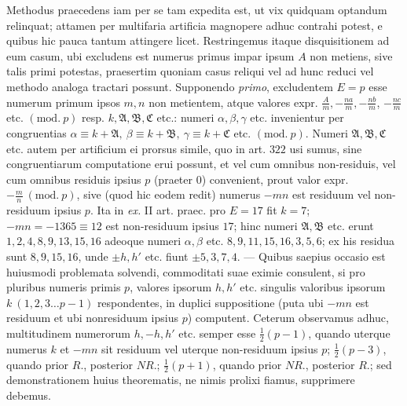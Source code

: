 Methodus praecedens iam per se tam expedita est, ut vix quidquam optandum relinquat; attamen per multifaria artificia magnopere adhuc contrahi potest, e quibus hic pauca tantum attingere licet. Restringemus itaque disquisitionem ad eum casum, ubi excludens est numerus primus impar ipsum \(A\) non metiens, sive talis primi potestas, praesertim quoniam casus reliqui vel ad hunc reduci vel methodo analoga tractari possunt. Supponendo \textit{primo}, excludentem \(E=p\) esse numerum primum ipsos \(m,\allowbreak n\) non metientem, atque valores expr. \(\frac Am,\allowbreak -\frac{na}m,\allowbreak -\frac{nb}m\), \(-\frac{nc}m\) etc. \((\mathrm{mod.}\ p)\) resp. \(k,\allowbreak \mathfrak A,\allowbreak \mathfrak B,\allowbreak \mathfrak C\) etc.: numeri \(\alpha,\allowbreak \beta,\allowbreak \gamma\) etc. invenientur per congruentias \(\alpha\equiv k+\mathfrak A,\allowbreak \ \beta\equiv k+\mathfrak B,\allowbreak \ \gamma\equiv k+\mathfrak C\) etc. \((\mathrm{mod.}\ p)\). Numeri \(\mathfrak A,\allowbreak \mathfrak B,\allowbreak \mathfrak C\) etc. autem per artificium ei prorsus simile, quo in art. \(322\) usi sumus, sine congruentiarum computatione erui possunt, et vel cum omnibus non-residuis, vel cum omnibus residuis ipsius \(p\) (praeter \(0\)) convenient, prout valor expr. \(-\frac mn\ (\mathrm{mod.}\ p)\), sive (quod hic eodem redit) numerus \(-mn\) est residuum vel non-residuum ipsius \(p\). Ita in \textit{ex.} II art. praec. pro \(E=17\) fit \(k=7\); \(-mn=-1365\equiv12\) est non-residuum ipsius \(17\); hinc numeri \(\mathfrak A,\allowbreak \mathfrak B\) etc. erunt \(1,\allowbreak 2,\allowbreak 4,\allowbreak 8,\allowbreak 9,\allowbreak 13,\allowbreak 15,\allowbreak 16\) adeoque numeri \(\alpha,\allowbreak \beta\) etc. \(8,\allowbreak 9,\allowbreak 11,\allowbreak 15,\allowbreak 16,\allowbreak 3,\allowbreak 5,\allowbreak 6\); ex his residua sunt \(8,\allowbreak 9,\allowbreak 15,\allowbreak 16\), unde \(\pm h,\allowbreak h'\) etc. fiunt \(\pm5,\allowbreak 3,\allowbreak 7,\allowbreak 4\). — Quibus saepius occasio est huiusmodi problemata solvendi, commoditati suae eximie consulent, si pro pluribus numeris primis \(p\), valores ipsorum \(h,\allowbreak h'\) etc. singulis valoribus ipsorum \(k\ (1,\allowbreak 2,\allowbreak 3\ldots p-1)\) respondentes, in duplici suppositione (puta ubi \(-mn\) est residuum et ubi nonresiduum ipsius \(p\)) computent. Ceterum observamus adhuc, multitudinem numerorum \(h,\allowbreak -h,\allowbreak h'\) etc. semper esse \(\frac12(p-1)\), quando uterque numerus \(k\) et \(-mn\) sit residuum vel uterque non-residuum ipsius \(p\); \(\frac12(p-3)\), quando prior \(R.\), posterior \(NR.\); \(\frac12(p+1)\), quando prior \(NR.\), posterior \(R.\); sed demonstrationem huius theorematis, ne nimis prolixi fiamus, supprimere debemus.

